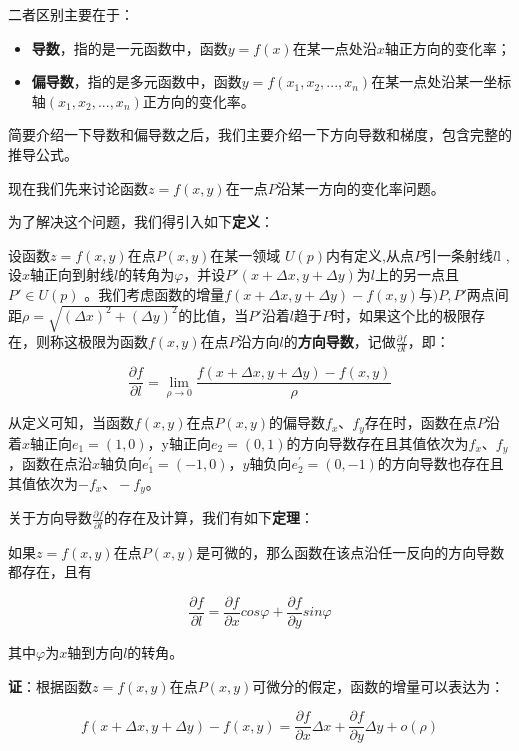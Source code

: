 \documentclass[]{book}
\begin{document}
二者区别主要在于：

\begin{itemize}
\item
  \textbf{导数}，指的是一元函数中，函数\(y = f(x)\)在某一点处沿\(x\)轴正方向的变化率；
\item
  \textbf{偏导数}，指的是多元函数中，函数\(y=f(x_{1},x_{2},...,x_{n})\)在某一点处沿某一坐标轴\((x_{1},x_{2},...,x_{n})\)正方向的变化率。
\end{itemize}

简要介绍一下导数和偏导数之后，我们主要介绍一下方向导数和梯度，包含完整的推导公式。

现在我们先来讨论函数\(z=f(x,y)\)在一点\(P\)沿某一方向的变化率问题。

为了解决这个问题，我们得引入如下\textbf{定义}：

设函数\(z=f(x,y)\)在点\(P(x,y)\)在某一领域 \(U(p)\)内有定义,从点\(P\)引一条射线\(l\)l ,设\(x\)轴正向到射线\(l\)的转角为\(\varphi\)，并设\(P'(x+\Delta x,y+\Delta y)\)为\(l\)上的另一点且\(P'\in U(p)\) 。我们考虑函数的增量\(f(x+\Delta x,y+\Delta y)-f(x,y)\)与\()P,P'\)两点间距\(\rho =\sqrt{(\Delta x)^{2}+(\Delta y)^{2}}\)的比值，当\(P'\)沿着\(l\)趋于\(P\)时，如果这个比的极限存在，则称这极限为函数\(f(x,y)\)在点\(P\)沿方向\(l\)的\textbf{方向导数}，记做\(\frac{\partial f}{\partial l}\)，即：

\[
\frac{\partial f}{\partial {l}}=\lim_{\rho \to 0}{\frac{f(x+\Delta x,y+\Delta y)-f(x,y)}{\rho}}
\]

从定义可知，当函数\(f(x,y)\)在点\(P(x,y)\)的偏导数\(f_x、f_y\)存在时，函数在点\(P\)沿着\(x\)轴正向\(e_1=(1,0)\)，y轴正向\(e_2=(0,1)\)的方向导数存在且其值依次为\(f_x、f_y\)，函数在点沿\(x\)轴负向\(e_1^′=(-1,0)\)，\(y\)轴负向\(e_2^′=(0,-1)\)的方向导数也存在且其值依次为\(-f_x 、-f_y\)。

关于方向导数\(\frac{ \partial f}{\partial l}\)的存在及计算，我们有如下\textbf{定理}：

如果\(z=f(x,y)\)在点\(P(x,y)\)是可微的，那么函数在该点沿任一反向的方向导数都存在，且有

\[
\frac{\partial f}{\partial {l}}=
\frac{\partial f}{\partial {x}}cos\varphi+\frac{\partial f}{\partial {y}}sin\varphi
\]

其中\(\varphi\)为\(x\)轴到方向\(l\)的转角。

\textbf{证}：根据函数\(z=f(x,y)\)在点\(P(x,y)\)可微分的假定，函数的增量可以表达为：

\[
f(x+\Delta x,y+\Delta y)-f(x,y)=
\frac{\partial f}{\partial x}\Delta x+\frac{\partial f}{\partial y} \Delta y+o(\rho)
\]
\end{document}
